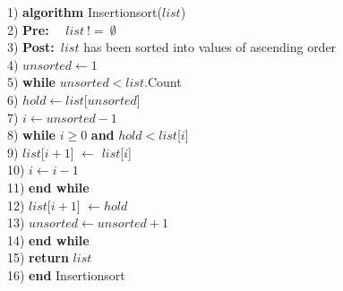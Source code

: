 \begin{tabbing}
1)  \textbf{alg}\= \textbf{orithm} Insertionsort($list$) \\
2)  \> \textbf{Pre:}~~ $list~!=~\emptyset$ \\
3)  \> \textbf{Post:}~$list$ has been sorted into values of ascending order \\
4)  \> $unsorted \leftarrow 1$ \\
5)  \> \textbf{whi}\= \textbf{le} $unsorted < list$.Count \\
6)  \> \> $hold \leftarrow list$[$unsorted$] \\
7)  \> \> $i \leftarrow unsorted - 1$ \\
8)  \> \> \textbf{whi}\= \textbf{le} $i \geq 0$ \textbf{and} $hold < list$[$i$] \\
9)  \> \> \> $list$[$i + 1$] $\leftarrow$ $list$[$i$] \\
10) \> \> \> $i \leftarrow i - 1$ \\
11) \> \> \textbf{end while} \\
12) \> \> $list$[$i+1$] $\leftarrow hold$ \\
13) \> \> $unsorted \leftarrow unsorted + 1$ \\
14) \> \textbf{end while} \\
15) \> \textbf{return} $list$ \\
16) \textbf{end} Insertionsort \\
\end{tabbing}

